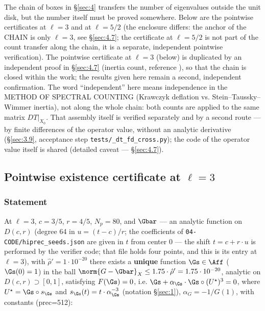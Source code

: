 The chain of boxes in \S\ref{sec:4} transfers the number of eigenvalues outside the unit
disk, but the number itself must be proved somewhere. Below are the pointwise
certificates at $\ell = 3$ and at $\ell = 5/2$ (the enclosure differs: the anchor of the
CHAIN is only $\ell = 3$,
see \S\ref{sec:4.7}; the certificate at
$\ell = 5/2$ is not part of the count transfer along the chain, it is a separate,
independent pointwise verification). The pointwise certificate at $\ell = 3$ (below)
is duplicated by an independent proof in \S\ref{sec:4.7} (inertia count, reference \cite{stein1952theorems, taussky1964matrices, wimmer1973ostrowski, horn1991topics}),
so that the chain is closed within the work; the results given here remain a
second, independent confirmation. The word ``independent'' here means
independence in the METHOD OF SPECTRAL COUNTING (Krawczyk deflation vs.
Stein--Taussky--Wimmer inertia), not along the whole chain: both counts are
applied to the same matrix $DT|_{X_{0}}$. That assembly itself is verified
separately and by a second route --- by finite differences of the operator
value, without an analytic derivative (\S\ref{sec:3.9}, acceptance step
\texttt{tests/\allowbreak \_\allowbreak dt\_\allowbreak fd\_\allowbreak cross.py}); the code of the operator value itself is shared
(detailed caveat --- \S\ref{sec:4.7}).


\subsection{Pointwise existence certificate at $\ell = 3$}
\label{sec:5.1}

\subsubsection{Statement}
\label{sec:5.1.1}

\begin{theorem}[Hyp-5-W5-L3]
At $\ell=3$, $c=3/5$, $r=4/5$, $N_p=80$, and $\Gbar$ --- an analytic
function on $D(c,r)$ (degree 64 in $u=(t-c)/r$; the coefficients of
\texttt{04-\allowbreak CODE/\allowbreak hiprec\_\allowbreak seeds.json} are given in $t$ from center 0 --- the shift
$t=c+r\cdot u$ is performed by the verifier code; that file holds four points,
and this is its entry at $\ell=3$),
with $\hat{\rho}' = 1\cdot 10^{-20}$ there exists a \textbf{unique} function
$\Gs \in \Aff$ ($\Gs(0)=1$) in the ball
$\norm{G-\Gbar}_X \le 1.75\cdot \hat{\rho}' = 1.75\cdot 10^{-20}$, analytic on
$D(c,r) \supset [0,1]$, satisfying $F(\Gs) = 0$, i.e.
$\Gs + \alpha_{\Gs}\cdot \Gs \circ (U^{\star})^{3} = 0$, where
$U^{\star} = \Gs \circ s_{\Gs}$ and $s_{\Gs}(t) = t\cdot \alpha_{\Gs}^{-3}$ (notation \S\ref{sec:1}),
$\alpha_G = -1/G(1)$, with constants
(prec=512):
\end{theorem}

